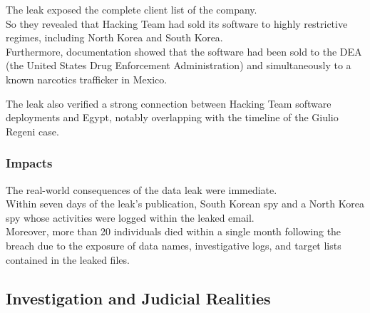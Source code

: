 \noindent
The leak exposed the complete client list of the company.\\
So they revealed that Hacking Team had sold its software to highly restrictive regimes, including North Korea and South Korea.\\ Furthermore, documentation showed that the software had been sold to the DEA (the United States Drug Enforcement Administration) and simultaneously to a known narcotics trafficker in Mexico.
\medskip

\noindent
The leak also verified a strong connection between Hacking Team software deployments and Egypt, notably overlapping with the timeline of the Giulio Regeni case.

\subsubsection*{Impacts}
The real-world consequences of the data leak were immediate. \\
Within seven days of the leak's publication, South Korean spy and a North Korea spy whose activities were logged within the leaked email.\\
Moreover, more than 20 individuals died within a single month following the breach due to the exposure of data names, investigative logs, and target lists contained in the leaked files.


\subsection{Investigation and Judicial Realities}

